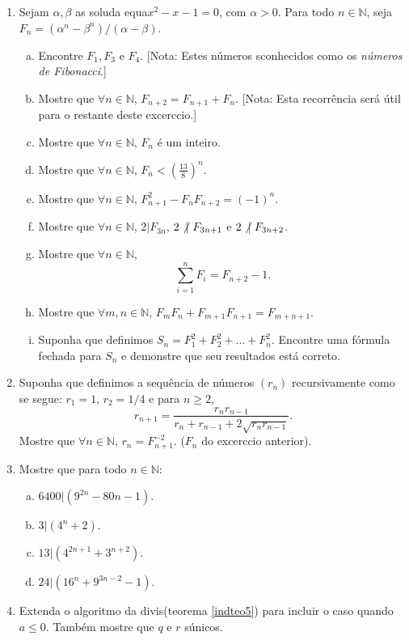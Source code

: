\begin{enumerate}[{\bf 1.}]
\item Sejam $\alpha,\beta$ as solu\coes da equa\cao $x^2-x-1=0$, com $\alpha >0$. Para todo $n\in\mathbb{N}$, seja $F_n=(\alpha^n-\beta^n)/(\alpha-\beta)$.
\begin{enumerate}[a)]
\item Encontre $F_1,F_3$ e $F_4$. [Nota: Estes n\'umeros s\ao conhecidos como os {\it n\'umeros de Fibonacci}.] 
\item Mostre que $\forall n\in\mathbb{N}$, $F_{n+2}=F_{n+1}+F_n$. [Nota: Esta recorr\^encia ser\'a \'util para o restante deste excerc\ih cio.]  
\item Mostre que $\forall n\in\mathbb{N}$, $F_n$ \'e um inteiro.
\item Mostre que $\forall n\in\mathbb{N}$, $F_n<(\frac{13}{8})^n$.
\item Mostre que $\forall n\in\mathbb{N}$, $F^2_{n+1}-F_nF_{n+2}=(-1)^n$.
\item Mostre que $\forall n\in\mathbb{N}$, $2|F_{3n}$, $2\not|\textrm{ } F_{3n+1}$ e $2\not|\textrm{ } F_{3n+2}$.
\item Mostre que $\forall n\in\mathbb{N}$, 
\[
\sum_{i=1}^{n}F_i=F_{n+2}-1.
\]
\item Mostre que $\forall m,n\in\mathbb{N}$, $F_mF_n+F_{m+1}F_{n+1}=F_{m+n+1}$. 
\item Suponha que definimos $S_n=F_{1}^{2}+F_{2}^{2}+\ldots+F_{n}^{2}$. Encontre uma f\'ormula fechada para $S_n$ e demonstre que seu resultados est\'a correto.
\end{enumerate}

\item Suponha que definimos a sequ\^encia de n\'umeros $(r_n)$ recursivamente como se segue: $r_1=1$, $r_2=1/4$ e para $n\geq 2$,
\[
r_{n+1}=\frac{r_nr_{n-1}}{r_n+r_{n-1}+2\sqrt{r_nr_{n-1}}}.
\]
Mostre que $\forall n\in\mathbb{N}$, $r_n=F^{-2}_{n+1}$. ($F_n$ do excerc\ih cio anterior).

\item Mostre que para todo $n\in\mathbb{N}:$
\begin{enumerate}[a)]
\item $6400|(9^{2n}-80n-1)$.
\item $3|(4^n+2)$.
\item $13|(4^{2n+1}+3^{n+2})$.
\item $24|(16^n+9^{3n-2}-1)$.
\end{enumerate}

\item Extenda o algoritmo da divis\ao (teorema \ref{indteo5}) para incluir o caso quando $a\leq 0$. Tamb\'em mostre que $q$ e $r$ s\ao \'unicos.


\end{enumerate}
